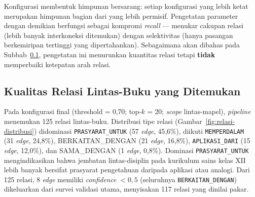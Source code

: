 \documentclass[main]{subfiles}
\begin{document}
Konfigurasi membentuk himpunan bersarang: setiap konfigurasi yang lebih
ketat merupakan himpunan bagian dari yang lebih permisif. Pengetatan
parameter dengan demikian berfungsi sebagai kompromi \textit{recall} ---
menukar cakupan relasi (lebih banyak interkoneksi ditemukan) dengan
selektivitas (hanya pasangan berkemiripan tertinggi yang dipertahankan).
Sebagaimana akan dibahas pada Subbab~\ref{subsubsec:kualitas}, pengetatan ini menurunkan
kuantitas relasi tetapi \textbf{tidak} memperbaiki ketepatan arah relasi.

\subsection{Kualitas Relasi Lintas-Buku yang Ditemukan}\label{subsubsec:kualitas}

Pada konfigurasi final (threshold = 0{,}70; top-$k$ = 20; \textit{scope}
lintas-mapel), \textit{pipeline} menemukan 125 relasi lintas-buku. Distribusi
tipe relasi (Gambar~\ref{fig:relasi-distribusi}) didominasi \texttt{PRASYARAT\_UNTUK} (57 \textit{edge}, 45{,}6\%), diikuti
\texttt{MEMPERDALAM} (31 \textit{edge}, 24{,}8\%), BERKAITAN\_DENGAN (21 \textit{edge}, 16{,}8\%),
\texttt{APLIKASI\_DARI} (15 \textit{edge}, 12{,}0\%), dan SAMA\_DENGAN (1 \textit{edge}, 0{,}8\%).
Dominasi \texttt{PRASYARAT\_UNTUK} mengindikasikan bahwa jembatan lintas-disiplin
pada kurikulum sains kelas XII lebih banyak bersifat prasyarat pengetahuan
daripada aplikasi atau analogi. Dari 125 relasi, 8 \textit{edge} memiliki \textit{confidence}
$< 0{,}5$ (seluruhnya \texttt{BERKAITAN\_DENGAN}) dikeluarkan dari survei validasi
utama, menyisakan 117 relasi yang dinilai pakar.
\end{document}
